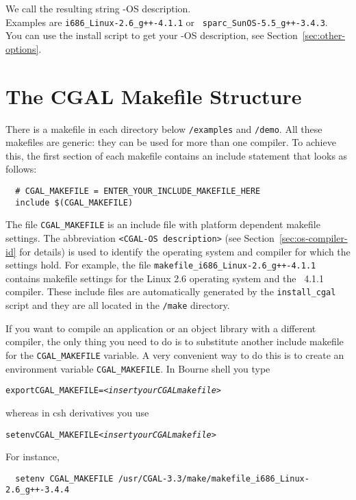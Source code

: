 We call the resulting string \cgal-OS description.\\ Examples are
\texttt{i686\_Linux-2.6\_g++-4.1.1} or {\tt
  sparc\_SunOS-5.5\_g++-3.4.3}.\\ You can use the install script to
get your \cgal-OS description, see Section~\ref{sec:other-options}.

\section{The CGAL Makefile Structure\label{sec:makefiles}}

There is a makefile in each directory below \texttt{\cgaldir/examples}
and \texttt{\cgaldir/demo}. All these makefiles are generic: they can
be used for more than one compiler. To achieve this, the first section
of each makefile contains an include statement that looks as follows:
\begin{verbatim}
  # CGAL_MAKEFILE = ENTER_YOUR_INCLUDE_MAKEFILE_HERE
  include $(CGAL_MAKEFILE)
\end{verbatim}

The file \texttt{CGAL\_MAKEFILE} is an include
file with platform dependent makefile
settings. The abbreviation \texttt{<CGAL-OS description>} (see
Section~\ref{sec:os-compiler-id} for details) is used to identify the
operating system and compiler for which the settings hold. For
example, the file \texttt{makefile\_i686\_Linux-2.6\_g++-4.1.1}
contains makefile settings for the Linux 2.6 operating system and the
\Gcc\ 4.1.1 compiler.  These include files are automatically
generated by the \texttt{install\_cgal} script and they are all
located in the \texttt{\cgaldir/make} directory.

If you want to compile an application or an object library with a
different compiler, the only thing you need to do is to substitute
another include makefile for the \texttt{CGAL\_MAKEFILE} variable. A
very convenient way to do this is to create an environment variable
\texttt{CGAL\_MAKEFILE}. In Bourne shell you type
\begin{alltt}
  export CGAL_MAKEFILE=<\textit{insert your CGAL makefile}>
\end{alltt}
whereas in csh derivatives you use
\begin{alltt}
  setenv CGAL_MAKEFILE <\textit{insert your CGAL makefile}>
\end{alltt}
For instance,
\begin{verbatim}
  setenv CGAL_MAKEFILE /usr/CGAL-3.3/make/makefile_i686_Linux-2.6_g++-3.4.4
\end{verbatim}

